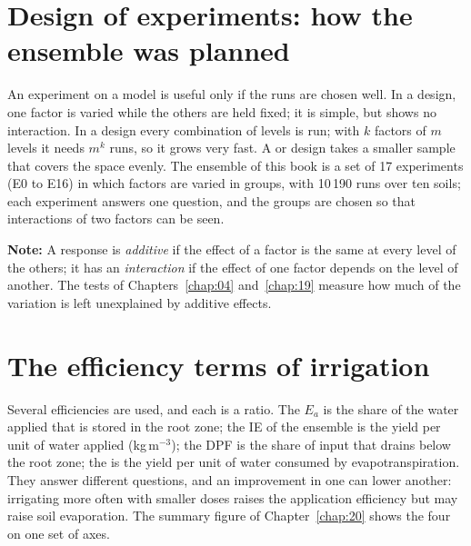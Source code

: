 \section{Design of experiments: how the ensemble was planned}
An experiment on a model is useful only if the runs are chosen well. In a  design, one factor is varied while the others are held fixed; it is simple, but shows no interaction. In a  design every combination of levels is run; with $k$ factors of $m$ levels it needs $m^k$ runs, so it grows very fast. A  or  design takes a smaller sample that covers the space evenly. The ensemble of this book is a set of 17 experiments (E0 to E16) in which factors are varied in groups, with 10\,190 runs over ten soils; each experiment answers one question, and the groups are chosen so that interactions of two factors can be seen.
\par\noindent \textbf{Note:} A response is \emph{additive} if the effect of a factor is the same at every level of the others; it has an \emph{interaction} if the effect of one factor depends on the level of another. The tests of Chapters~\ref{chap:04} and~\ref{chap:19} measure how much of the variation is left unexplained by additive effects.

\section{The efficiency terms of irrigation}
Several efficiencies are used, and each is a ratio. The  $E_a$ is the share of the water applied that is stored in the root zone; the  IE of the ensemble is the yield per unit of water applied (kg\,m$^{-3}$); the  DPF is the share of input that drains below the root zone; the  is the yield per unit of water consumed by evapotranspiration. They answer different questions, and an improvement in one can lower another: irrigating more often with smaller doses raises the application efficiency but may raise soil evaporation. The summary figure of Chapter~\ref{chap:20} shows the four on one set of axes.
